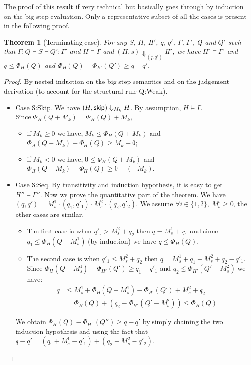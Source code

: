 \documentclass[nocopyrightspace,preprint]{sigplanconf}
\newtheorem{theorem}{Theorem}
\begin{document}
The proof of this result if very technical but basically goes through by induction
on the big-step evaluation.  Only a representative subset of all the cases
is present in the following proof.


\begin{theorem}[Terminating case]
For any $S$, $H$, $H'$, $q$, $q'$, $\Gamma$, $\Gamma'$, $Q$ and $Q'$ such
that $\Gamma; Q \vdash S \dashv Q'; \Gamma'$ and $H \models \Gamma$ and
$(H,s) \Downarrow_{(q,q')} H'$, we have
$H' \models \Gamma'$ and
$q \le \Phi_H(Q)$ and
$\Phi_H(Q) - \Phi_{H'}(Q') \ge q - q'$.
\end{theorem}

\begin{proof} By nested induction on the big step semantics and on the
judgement derivation (to account for the structural rule {\sc Q:Weak}).

\begin{itemize}

\item Case {\sc S:Skip}.
  We have $(H, \mathsf{skip}) \Downarrow_{M_k} H$.
  By assumption, $H \models \Gamma$. \\
  Since $\Phi_H(Q + M_k) = \Phi_H(Q) + M_k$,
  \begin{itemize}[topsep=0pt]
  \item
    if $M_k \ge 0$ we have,
      $M_k \le \Phi_H(Q + M_k)$ and
      $\Phi_H(Q + M_k) - \Phi_H(Q) \ge M_k - 0$;
  \item
    if $M_k < 0$ we have,
      $0 \le \Phi_H(Q + M_k)$ and
      $\Phi_H(Q + M_k) - \Phi_H(Q) \ge 0 - (-M_k)$.
  \end{itemize}

\item Case {\sc S:Seq}.
  By transitivity and induction hypothesis, it is
  easy to get $H'' \models \Gamma''$.  Now we prove
  the quantitative part of the theorem.  We have
  $(q, q') = M_s^1 \cdot (q_1, q'_1) \cdot M_s^2 \cdot (q_2, q'_2)$.
  We assume $\forall i \in \{1, 2\},~M_s^i \ge 0$, the other cases
  are similar.
  \begin{itemize}[topsep=0pt]
  \item
    The first case is when $q'_1 > M_s^2 + q_2$ then $q = M_s^1 + q_1$
    and since $q_1 \le \Phi_H(Q - M_s^1)$ (by induction) we have
    $q \le \Phi_H(Q)$.
  \item
    The second case is when $q'_1 \le M_s^2 + q_2$ then $q = M_s^1 + q_1 + M_s^2 + q_2 - q'_1$. \\
    Since $\Phi_H(Q - M_s^1) - \Phi_{H'}(Q') \ge q_1 - q'_1$
    and $q_2 \le \Phi_{H'}(Q' - M_s^2)$ we have:
    \begin{align*}
    q &\le M_s^1 + \Phi_H(Q - M_s^1) - \Phi_{H'}(Q') + M_s^2 + q_2 \\
      &= \Phi_H(Q) + (q_2 - \Phi_{H'}(Q' - M_s^2)) \le \Phi_H(Q).
   \end{align*}
  \end{itemize}
  We obtain $\Phi_H(Q) - \Phi_{H''}(Q'') \ge q - q'$ by simply chaining
  the two induction hypothesis and using the fact that $q - q' =
  (q_1 + M_s^1 - q'_1) + (q_2 + M_s^2 - q'_2)$.


\end{itemize}
\end{proof}
\end{document}
